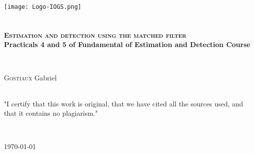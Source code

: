\begin{titlepage}
\begin{center}

\texttt{[image: Logo-IOGS.png]}~\\[1.5cm]


\textsc{\Large }\\[0.5cm]

\HRule \\[0.4cm]

{\bfseries
\huge \textsc{Estimation and detection using the matched filter}\\[0.5cm]
\Large Practicals 4 and 5 of Fundamental of Estimation and Detection Course}

\HRule \\[1cm]

\begin{minipage}{0.8\textwidth}
\begin{flushleft} \large
\textsc{Gostiaux} Gabriel \\[1cm]
\end{flushleft}
\end{minipage}


\textsc{\Large }\\[1cm]
"I certify that this work is original, that we have cited all the sources used, and that it contains no plagiarism."

\textsc{\Large }\\[1cm]




\vfill

{\large \today}

\end{center}
\end{titlepage}